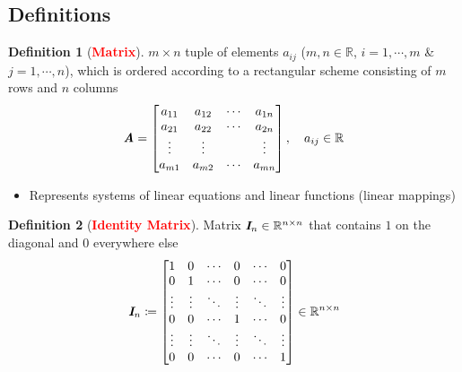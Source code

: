 \documentclass[12pt]{article}
\theoremstyle{definition}
\newtheorem{definition}{Definition}[section]
\newcommand{\keyword}[1]{\textbf{\textcolor{red}{#1}}}
\newcommand{\mat}[1]{\textit{\textbf{#1}}}
\begin{document}
        \subsection{Definitions}
            \begin{definition}[\keyword{Matrix}]
                $m\times n$ tuple of elements $a_{ij}$ ($m, n \in \mathbb{R}$, 
                $i = 1, \cdots ,m$ \& $j = 1, \cdots, n$), which is ordered 
                according to a rectangular scheme consisting of $m$ rows and 
                $n$ columns
                \begin{equation*}
                    \mat{A} = \left[
                        \begin{matrix}
                            a_{11} & a_{12} & \cdots & a_{1n}\\
                            a_{21} & a_{22} & \cdots & a_{2n}\\
                            \vdots & \vdots &        & \vdots\\
                            a_{m1} & a_{m2} & \cdots & a_{mn}
                        \end{matrix}
                    \right], \quad a_{ij} \in \mathbb{R}
                \end{equation*}
                \begin{itemize}
                    \item Represents systems of linear equations and linear 
                        functions (linear mappings)
                \end{itemize}
            \end{definition}
            \begin{definition}[\keyword{Identity Matrix}] 
                Matrix $\mat{I}_n \in \mathbb{R}^{n\times n}$ that contains $1$ on the diagonal 
                and $0$ everywhere else
                \begin{equation*}
                    \mat{I}_n \coloneqq \left[
                        \begin{matrix}
                            1      & 0      & \cdots & 0      & \cdots & 0      \\
                            0      & 1      & \cdots & 0      & \cdots & 0      \\
                            \vdots & \vdots & \ddots & \vdots & \ddots & \vdots \\
                            0      & 0      & \cdots & 1      & \cdots & 0      \\
                            \vdots & \vdots & \ddots & \vdots & \ddots & \vdots \\
                            0      & 0      & \cdots & 0      & \cdots & 1      
                        \end{matrix}
                    \right] \in \mathbb{R}^{n\times n}
                \end{equation*}
            \end{definition}
\end{document}
